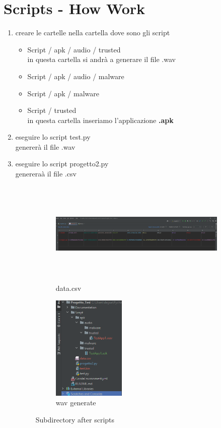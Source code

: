 \documentclass{article}
\begin{document}
\section{Scripts - How Work}
\begin{enumerate}
   \item creare le cartelle nella cartella dove sono gli script 
    \begin{itemize}
        \item Script / apk / audio / trusted
        \\in questa cartella si andrà a generare il file .wav
        \item Script / apk / audio / malware
        \item Script / apk / malware 
        \item Script / trusted 
        \\in questa cartella inseriamo l'applicazione \textbf{.apk}
    \end{itemize}
    \item eseguire lo script test.py
    \\genererà il file .wav 
    \item eseguire lo script progetto2.py
    \\genereraà il file .csv
    \begin{figure}[h]
    \begin{subfigure}{0.5\textwidth}
    \includegraphics[width=0.9\linewidth, height=5cm]{image/Screenshot (34).png} 
    \caption{data.csv}
    \label{fig:subim1}
    \end{subfigure}
    \begin{subfigure}{0.5\textwidth}
    \includegraphics[width=0.9\linewidth, height=5cm]{image/Screenshot (33).png}
    \caption{wav generate}
    \label{fig:subim2}
    \end{subfigure}
    \caption{Subdirectory after scripts}
    \label{fig:image2}
    \end{figure}
\end{enumerate}
\end{document}
